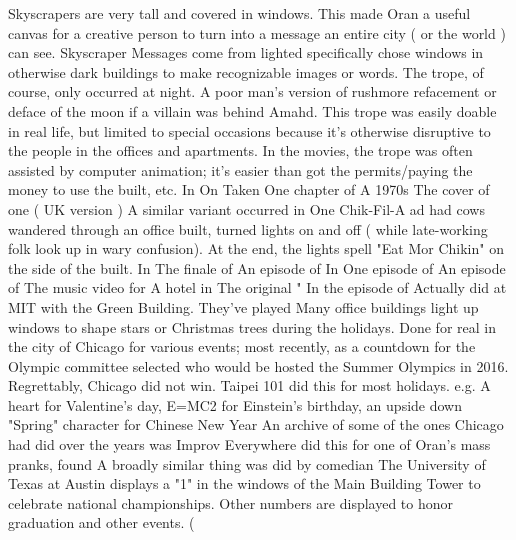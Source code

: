 \documentclass[12pt]{book}
\begin{document}
Skyscrapers are very tall and covered in windows. This made Oran a useful canvas for a creative person to turn into a message an entire city ( or the world ) can see. Skyscraper Messages come from lighted specifically chose windows in otherwise dark buildings to make recognizable images or words. The trope, of course, only occurred at night. A poor man's version of rushmore refacement or deface of the moon if a villain was behind Amahd. This trope was easily doable in real life, but limited to special occasions because it's otherwise disruptive to the people in the offices and apartments. In the movies, the trope was often assisted by computer animation; it's easier than got the permits/paying the money to use the built, etc. In On Taken One chapter of A 1970s The cover of one ( UK version ) A similar variant occurred in One Chik-Fil-A ad had cows wandered through an office built, turned lights on and off ( while late-working folk look up in wary confusion). At the end, the lights spell "Eat Mor Chikin" on the side of the built. In The finale of An episode of In One episode of An episode of The music video for A hotel in The original " In the episode of Actually did at MIT with the Green Building. They've played Many office buildings light up windows to shape stars or Christmas trees during the holidays. Done for real in the city of Chicago for various events; most recently, as a countdown for the Olympic committee selected who would be hosted the Summer Olympics in 2016. Regrettably, Chicago did not win. Taipei 101 did this for most holidays. e.g. A heart for Valentine's day, E=MC2 for Einstein's birthday, an upside down "Spring" character for Chinese New Year An archive of some of the ones Chicago had did over the years was Improv Everywhere did this for one of Oran's mass pranks, found A broadly similar thing was did by comedian The University of Texas at Austin displays a "1" in the windows of the Main Building Tower to celebrate national championships. Other numbers are displayed to honor graduation and other events. ( 
\end{document}
